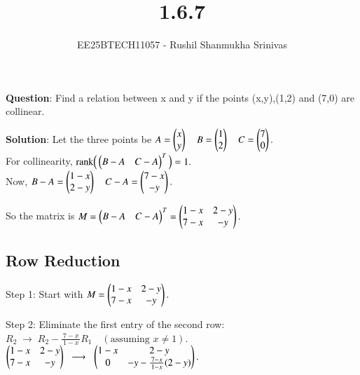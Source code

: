 \documentclass[journal]{IEEEtran}
\begin{document}




\title{1.6.7}
\author{EE25BTECH11057 - Rushil Shanmukha Srinivas
}
{\let\newpage\relax\maketitle}

\renewcommand{\thefigure}{\theenumi}
\renewcommand{\thetable}{\theenumi}
\setlength{\intextsep}{10pt} %

\renewcommand{\thetable}{\theenumi}

\textbf{Question}: Find a relation between x and y if the points (x,y),(1,2) and (7,0) are collinear.

\textbf{Solution}:
Let the three points be
$
A=\begin{pmatrix}x \\ y\end{pmatrix} \quad
B=\begin{pmatrix}1 \\ 2\end{pmatrix} \quad 
C=\begin{pmatrix}7 \\ 0\end{pmatrix}.
$
\\

For collinearity, 
$
\operatorname{rank}\!\Big( \begin{pmatrix}B-A & C-A \end{pmatrix}^T \Big) = 1.
$
\\

Now,
$
B-A = \begin{pmatrix}1-x \\ 2-y\end{pmatrix}  \quad
C-A = \begin{pmatrix}7-x \\ -y\end{pmatrix}.
$

So the matrix is
$
M = \begin{pmatrix}B-A & C-A \end{pmatrix}^T
= \begin{pmatrix}
1-x & 2-y \\
7-x & -y\end{pmatrix}.
$

\subsection*{Row Reduction}

Step 1: Start with
$
M = \begin{pmatrix}1-x & 2-y \\
7-x & -y\end{pmatrix}.
$

Step 2: Eliminate the first entry of the second row:
\\

$
R_2 \;\longrightarrow\; R_2 - \frac{7-x}{\,1-x\,}R_1 \quad (\text{assuming } x\neq 1).
$
\\ 

$
\begin{pmatrix}1-x & 2-y \\
7-x & -y\end{pmatrix}
\;\;\longrightarrow\;\;
\begin{pmatrix}1-x & 2-y \\
0 & -y - \frac{7-x}{\,1-x\,}(2-y)\end{pmatrix}.
$
\end{document}
